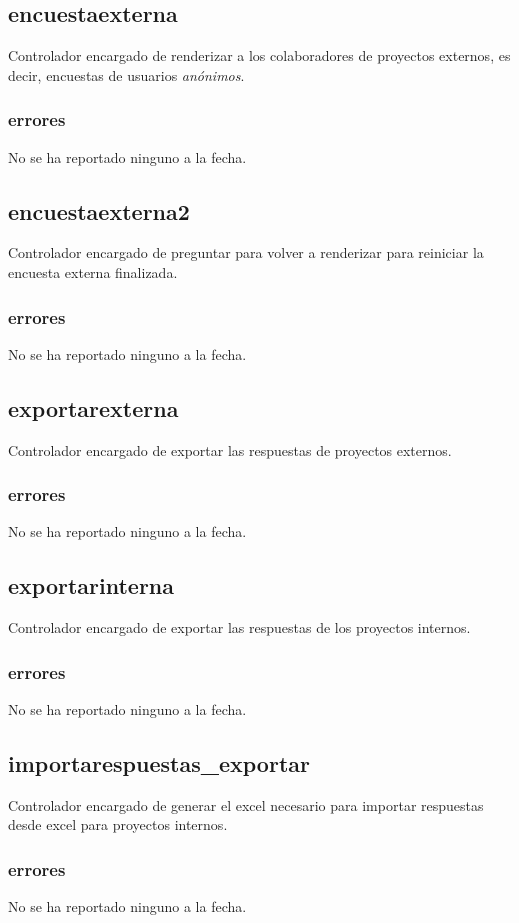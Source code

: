 \documentclass[10pt,a4paper]{book}
\begin{document}
	\subsection{encuestaexterna}
	Controlador encargado de renderizar a los colaboradores de proyectos externos, es decir, encuestas de usuarios \textit{anónimos}.
	\subsubsection{errores}
	No se ha reportado ninguno a la fecha.

	\subsection{encuestaexterna2}
	Controlador encargado de preguntar para volver a renderizar para reiniciar la encuesta externa finalizada.
	\subsubsection{errores}
	No se ha reportado ninguno a la fecha.

	\subsection{exportarexterna}
	Controlador encargado de exportar las respuestas de proyectos externos.
	\subsubsection{errores}
	No se ha reportado ninguno a la fecha.

	\subsection{exportarinterna}
	Controlador encargado de exportar las respuestas de los proyectos internos.
	\subsubsection{errores}
	No se ha reportado ninguno a la fecha.

	\subsection{importarespuestas\_exportar}
	Controlador encargado de generar el excel necesario para importar respuestas desde excel para proyectos internos.
	\subsubsection{errores}
	No se ha reportado ninguno a la fecha.
\end{document}
